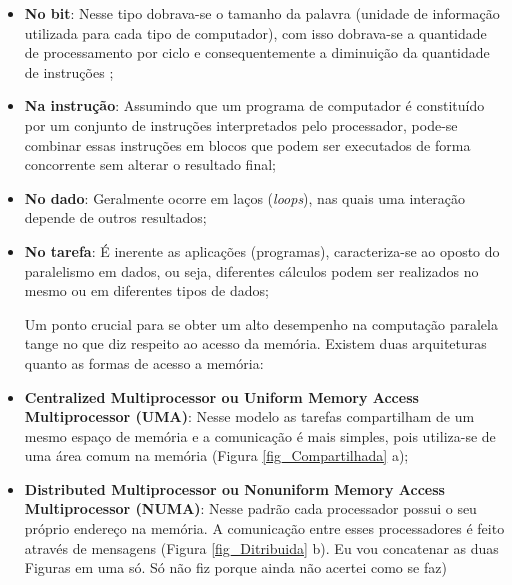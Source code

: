 \begin{itemize}
\item \textbf{No bit}: Nesse tipo dobrava-se o tamanho da palavra (unidade de informação utilizada para cada tipo de computador), com isso dobrava-se a quantidade de processamento por ciclo e consequentemente a diminuição da quantidade de instruções \cite{sriram2009embedded};

\item \textbf{Na instrução}: Assumindo que um programa de computador é constituído por um conjunto de instruções interpretados pelo processador, pode-se combinar essas instruções em blocos que podem ser executados de forma concorrente sem alterar o resultado final\cite{sriram2009embedded};

\item \textbf{No dado}: Geralmente ocorre em laços (\textit{loops}), nas quais uma interação depende de outros resultados\cite{sriram2009embedded};

\item \textbf{No tarefa}: É inerente as aplicações (programas), caracteriza-se ao oposto do paralelismo em dados, ou seja, diferentes cálculos podem ser realizados no mesmo ou em diferentes tipos de dados\cite{sriram2009embedded};

Um ponto crucial para se obter um alto desempenho na computação paralela tange no que diz respeito ao acesso da memória. Existem duas arquiteturas quanto as formas de acesso a memória:

\item \textbf{Centralized Multiprocessor ou Uniform Memory Access Multiprocessor (UMA)}: Nesse modelo as tarefas compartilham de um mesmo espaço de memória e a comunicação é mais simples, pois utiliza-se de uma área comum na memória (Figura \ref{fig_Compartilhada} a);

\item \textbf{Distributed Multiprocessor ou Nonuniform Memory Access Multiprocessor (NUMA)}: Nesse padrão cada processador possui o seu próprio endereço na memória. A comunicação entre esses processadores é feito através de mensagens (Figura \ref{fig_Ditribuida} b). {\color{red} Eu vou concatenar as duas Figuras em uma só. Só não fiz porque ainda não acertei como se faz})
\end{itemize}

